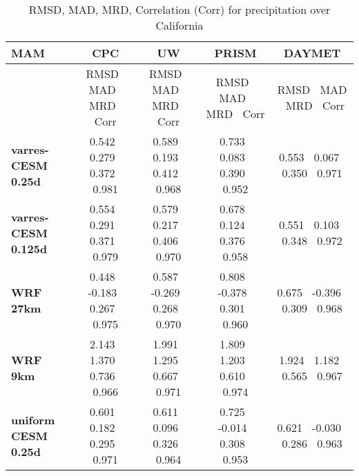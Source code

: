 \begin{table}
\begin{center}
\caption{RMSD, MAD, MRD, Correlation (Corr) for precipitation over California}
\begin{tabular}{lcccc}
\hline \textbf{MAM} & \textbf{CPC}  & \textbf{UW} & \textbf{PRISM} & \textbf{DAYMET} \\
\hline $    $ & RMSD $\ $ MAD $\ $ MRD $\ $ Corr & RMSD $\ $ MAD $\ $ MRD $\ $ Corr & RMSD $\ $ MAD $\ $ MRD $\ $ Corr & RMSD $\ $ MAD $\ $ MRD $\ $ Corr \\
\hline \textbf{varres-CESM 0.25d} & 0.542 $\ $ 0.279 $\ $ 0.372 $\ $ 0.981 & 0.589 $\ $ 0.193 $\ $ 0.412 $\ $ 0.968 & 0.733 $\ $ 0.083 $\ $ 0.390 $\ $ 0.952 & 0.553 $\ $ 0.067 $\ $ 0.350 $\ $ 0.971 \\
\textbf{varres-CESM 0.125d} & 0.554 $\ $ 0.291 $\ $ 0.371 $\ $ 0.979 & 0.579 $\ $ 0.217 $\ $ 0.406 $\ $ 0.970 & 0.678 $\ $ 0.124 $\ $ 0.376 $\ $ 0.958 & 0.551 $\ $ 0.103 $\ $ 0.348 $\ $ 0.972 \\
\textbf{WRF 27km} & 0.448 $\ $ -0.183 $\ $ 0.267 $\ $ 0.975 & 0.587 $\ $ -0.269 $\ $ 0.268 $\ $ 0.970 & 0.808 $\ $ -0.378 $\ $ 0.301 $\ $ 0.960 & 0.675 $\ $ -0.396 $\ $ 0.309 $\ $ 0.968 \\
\textbf{WRF 9km} & 2.143 $\ $ 1.370 $\ $ 0.736 $\ $ 0.966 & 1.991 $\ $ 1.295 $\ $ 0.667 $\ $ 0.971 & 1.809 $\ $ 1.203 $\ $ 0.610 $\ $ 0.974 & 1.924 $\ $ 1.182 $\ $ 0.565 $\ $ 0.967 \\
\textbf{uniform CESM 0.25d} & 0.601 $\ $ 0.182 $\ $ 0.295 $\ $ 0.971 & 0.611 $\ $ 0.096 $\ $ 0.326 $\ $ 0.964 & 0.725 $\ $ -0.014 $\ $ 0.308 $\ $ 0.953 & 0.621 $\ $ -0.030 $\ $ 0.286 $\ $ 0.963 \\
\hline
\end{tabular}


\end{center}
\end{table}
